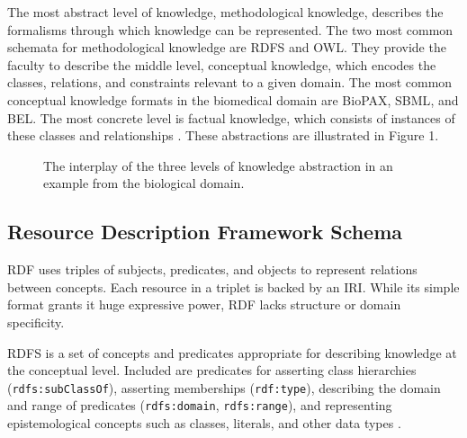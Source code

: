 The most abstract level of knowledge, methodological knowledge, describes the formalisms through which knowledge can be represented. The two most common schemata for methodological knowledge are \ac{RDFS} and \ac{OWL}. They provide the faculty to describe the middle level, conceptual knowledge, which encodes the classes, relations, and constraints relevant to a given domain.  The most common conceptual knowledge formats in the biomedical domain are \ac{BioPAX}, \ac{SBML}, and \ac{BEL}. The most concrete level is factual knowledge, which consists of instances of these classes and relationships \cite{Marchetti2008}. These abstractions are illustrated in Figure 1.

\begin{figure}
    \captionsetup{format=plain}
    \caption[Levels of Knowledge Abstraction]{The interplay of the three levels of knowledge abstraction in an example from the biological domain.}
    \label{Fig:knowledge_types}
\end{figure}

\subsection{Resource Description Framework Schema}
    
\ac{RDF} uses triples of subjects, predicates, and objects to represent relations between concepts. Each resource in a triplet is backed by an \ac{IRI}. While its simple format grants it huge expressive power, RDF lacks structure or domain specificity. 

\ac{RDFS} is a set of concepts and predicates appropriate for describing knowledge at the conceptual level. Included are predicates for asserting class hierarchies (\verb|rdfs:subClassOf|), asserting memberships (\verb|rdf:type|), describing the domain and range of predicates (\verb|rdfs:domain|, \verb|rdfs:range|), and representing epistemological concepts such as classes, literals, and other data types \cite{Beckett2014}.

